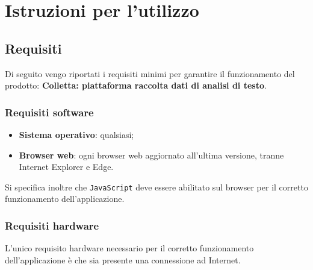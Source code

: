 \section{Istruzioni per l'utilizzo}

    \subsection{Requisiti}
    Di seguito vengo riportati i requisiti minimi per garantire il funzionamento del prodotto: 
\textbf{Colletta: piattaforma raccolta dati di analisi di testo}. 


\subsubsection{Requisiti software}
\begin{itemize}
\item \textbf{Sistema operativo}: qualsiasi;
\item \textbf{Browser web}: ogni browser web aggiornato all'ultima versione, tranne Internet Explorer e Edge.
\end{itemize}
Si specifica inoltre che \texttt{JavaScript} deve essere abilitato sul browser per il corretto funzionamento dell’applicazione.

\subsubsection{Requisiti hardware}
L'unico requisito hardware necessario per il corretto funzionamento dell'applicazione è che sia presente una connessione ad Internet. 
\newpage

